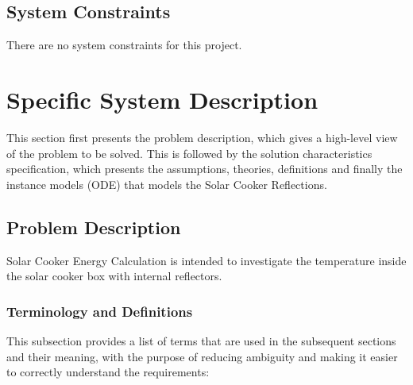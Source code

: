 \documentclass[12pt]{article}
\begin{document}
\subsection{System Constraints}

There are no system constraints for this project.

\section{Specific System Description}

This section first presents the problem description, which gives a high-level
view of the problem to be solved.  This is followed by the solution characteristics
specification, which presents the assumptions, theories, definitions and finally
the instance models (ODE) that models the Solar Cooker Reflections.

\subsection{Problem Description} \label{Sec_pd}

Solar Cooker Energy Calculation is intended to investigate the temperature inside the solar cooker box with internal reflectors. 

\subsubsection{Terminology and  Definitions}

This subsection provides a list of terms that are used in the subsequent
sections and their meaning, with the purpose of reducing ambiguity and making it
easier to correctly understand the requirements:
\end{document}
